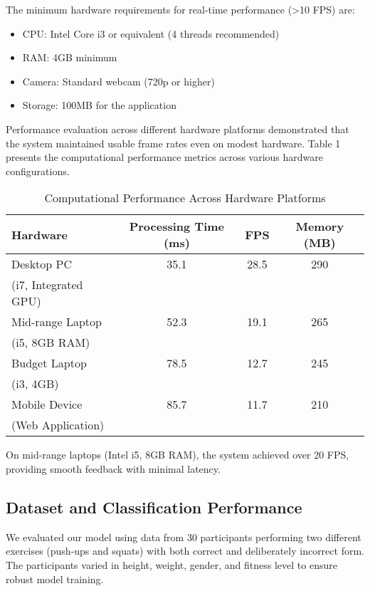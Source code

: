 \documentclass[11pt]{article}
\begin{document}
The minimum hardware requirements for real-time performance (>10 FPS) are:
\begin{itemize}
\item CPU: Intel Core i3 or equivalent (4 threads recommended)
\item RAM: 4GB minimum
\item Camera: Standard webcam (720p or higher)
\item Storage: 100MB for the application
\end{itemize}

Performance evaluation across different hardware platforms demonstrated that the system maintained usable frame rates even on modest hardware. Table 1 presents the computational performance metrics across various hardware configurations.

\begin{table}[h]
\caption{Computational Performance Across Hardware Platforms}
\begin{center}
\begin{tabular}{|l|c|c|c|}
\hline
\textbf{Hardware} & \textbf{Processing Time (ms)} & \textbf{FPS} & \textbf{Memory (MB)} \\
\hline
Desktop PC & 35.1 & 28.5 & 290 \\
(i7, Integrated GPU) & & & \\
\hline
Mid-range Laptop & 52.3 & 19.1 & 265 \\
(i5, 8GB RAM) & & & \\
\hline
Budget Laptop & 78.5 & 12.7 & 245 \\
(i3, 4GB) & & & \\
\hline
Mobile Device & 85.7 & 11.7 & 210 \\
(Web Application) & & & \\
\hline
\end{tabular}
\label{tab:performance}
\end{center}
\end{table}

On mid-range laptops (Intel i5, 8GB RAM), the system achieved over 20 FPS, providing smooth feedback with minimal latency.

\subsection{Dataset and Classification Performance}
We evaluated our model using data from 30 participants performing two different exercises (push-ups and squats) with both correct and deliberately incorrect form. The participants varied in height, weight, gender, and fitness level to ensure robust model training.
\end{document}
